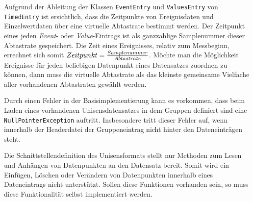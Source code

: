 Aufgrund der Ableitung der Klassen \verb|EventEntry| und \verb|ValuesEntry| von \verb|TimedEntry| ist ersichtlich, dass die Zeitpunkte von Ereignisdaten und Einzelwertdaten \"uber eine virtuelle Abtastrate bestimmt werden.
Der Zeitpunkt eines jeden \emph{Event}- oder \emph{Value}-Eintrags ist als ganzzahlige Samplenummer dieser Abtastrate gespeichert.
Die Zeit eines Ereignisses, relativ zum Messbeginn, errechnet sich somit $Zeitpunkt = {Samplenummer \over Abtastrate}$.
M\"ochte man die M\"oglichkeit Ereignisse f\"ur jeden beliebigen Datenpunkt eines Datensatzes zuordnen zu k\"onnen, dann muss die virtuelle Abtastrate als das kleinste gemeinsame Vielfache aller vorhandenen Abtastraten gew\"ahlt werden.

Durch einen Fehler in der Basisimplementierung kann es vorkommen, dass beim Laden eines vorhandenen Unisensdatensatzes in dem Gruppen definiert sind eine \verb|NullPointerException| auftritt.
Insbesondere tritt dieser Fehler auf, wenn innerhalb der Headerdatei der Gruppeneintrag nicht hinter den Dateneintr\"agen steht.

Die Schnittstellendefinition des Unisensformats stellt nur Methoden zum Lesen und Anh\"angen von Datenpunkten an den Datensatz bereit.
Somit wird ein Einf\"ugen, L\"oschen oder Ver\"andern von Datenpunkten innerhalb eines Dateneintrags nicht unterst\"utzt.
Sollen diese Funktionen vorhanden sein, so muss diese Funktionalit\"at selbst implementiert werden.

